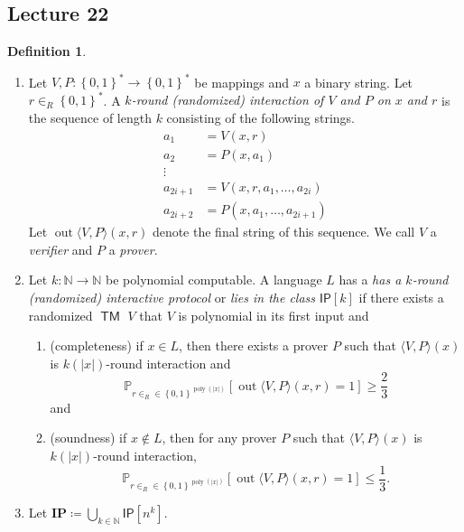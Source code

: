 \documentclass[10pt,letterpaper,cm]{nupset}
\theoremstyle{definition}
\newtheorem{definition}{Definition}[subsection]
\theoremstyle{theorem}
\theoremstyle{remark}
\newcommand{\N}{\mathbb N}
\newcommand{\1}{\mathbf{1}}
\newcommand{\0}{\vec 0}
\DeclareMathOperator{\out}{out}
\DeclareMathOperator{\TM}{\mathsf{TM}}
\DeclareMathOperator{\poly}{poly}
\begin{document}
\subsection{Lecture 22}

\begin{definition} $ $
\begin{enumerate}
\item  Let $V, P: \left\{0,1\right\}^{\ast} \to \left\{0,1\right\}^{\ast}$ be mappings and $x$ a binary string. Let $r\in_R \left\{0,1\right\}^{\ast}$. A \textit{$k$-round (randomized) interaction of $V$ and $P$ on $x$ and $r$} is the sequence of length $k$  consisting of the following strings.
\[
\begin{aligned} a_{1} &=V(x, r) \\ a_{2} &=P\left(x, a_{1}\right) \\ \vdots & \\ a_{2 i+1} &=V\left(x,r, a_{1}, \ldots, a_{2 i}\right) \\ a_{2 i+2} &=P\left(x, a_{1}, \ldots, a_{2 i+1}\right) \end{aligned}
\] Let $\out{\langle V, P\rangle (x, r)}$ denote the final string of this sequence. We call $V$ a \textit{verifier} and $P$ a \textit{prover}.
\item Let $k : \N \to \N$ be polynomial computable. A language $L$ has a \textit{has a $k$-round (randomized) interactive protocol} or \textit{lies in the class $\mathsf{IP}[k]$} if there exists a randomized $\TM$ $V$ that $V$ is polynomial in its first input and
\begin{enumerate}
\item (completeness) if $x\in L$, then there exists a prover $P$ such that $\langle V, P\rangle(x)$ is $k(\lvert{x}\rvert)$-round interaction and $$\mathbb{P}_{r\in_R \in \left\{0,1\right\}^{\poly(\lvert{x}\rvert)}}\left[\out{\langle V, P\rangle(x, r)} =1\right] \geq \frac{2}{3}$$ and 
\item (soundness) if $x\notin L$, then for any prover $P$ such that $\langle V, P\rangle(x)$ is $k(\lvert{x}\rvert)$-round interaction, $$\mathbb{P}_{r\in_R \in \left\{0,1\right\}^{\poly(\lvert{x}\rvert)}}\left[\out{\langle V, P\rangle(x, r)} =1\right] \leq \frac{1}{3}.$$
\end{enumerate}
\item Let $\mathbf{IP} \coloneqq \bigcup_{k\in \N}\mathsf{IP}[n^k]$.
\end{enumerate}
\end{definition}
\end{document}

